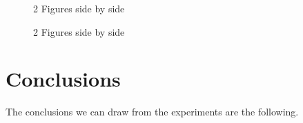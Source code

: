 \documentclass[12pt]{article}
\begin{document}
	\begin{figure}[H]
		\centering
		\qquad
		\caption{2 Figures side by side}%
		\label{fig:hjjkhl}%
	\end{figure}


	\begin{figure}[H]
		\centering
		\qquad
		\caption{2 Figures side by side}%
		\label{fig:scaling_seedup}%
	\end{figure}


	\section{Conclusions}
	The conclusions we can draw from the experiments are the following. 
	
	
\end{document}
